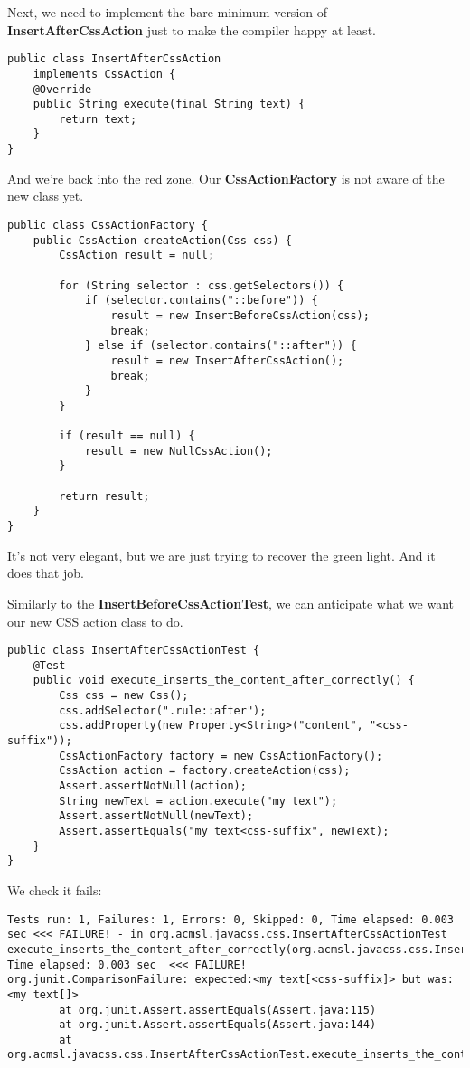 \documentclass[11pt]{article}
\begin{document}
Next, we need to implement the bare minimum version of \textbf{InsertAfterCssAction} just to make the
compiler happy at least.

\begin{verbatim}
public class InsertAfterCssAction
    implements CssAction {
    @Override
    public String execute(final String text) {
        return text;
    }
}
\end{verbatim}

And we're back into the red zone. Our \textbf{CssActionFactory} is not aware of the new class yet.

\begin{verbatim}
public class CssActionFactory {
    public CssAction createAction(Css css) {
        CssAction result = null;

        for (String selector : css.getSelectors()) {
            if (selector.contains("::before")) {
                result = new InsertBeforeCssAction(css);
                break;
            } else if (selector.contains("::after")) {
                result = new InsertAfterCssAction();
                break;
            }
        }

        if (result == null) {
            result = new NullCssAction();
        }

        return result;
    }
}
\end{verbatim}

It's not very elegant, but we are just trying to recover the green light. And it does
that job.

Similarly to the \textbf{InsertBeforeCssActionTest}, we can anticipate what we want our
new CSS action class to do.

\begin{verbatim}
public class InsertAfterCssActionTest {
    @Test
    public void execute_inserts_the_content_after_correctly() {
        Css css = new Css();
        css.addSelector(".rule::after");
        css.addProperty(new Property<String>("content", "<css-suffix"));
        CssActionFactory factory = new CssActionFactory();
        CssAction action = factory.createAction(css);
        Assert.assertNotNull(action);
        String newText = action.execute("my text");
        Assert.assertNotNull(newText);
        Assert.assertEquals("my text<css-suffix", newText);
    }
}
\end{verbatim}

We check it fails:

\begin{verbatim}
Tests run: 1, Failures: 1, Errors: 0, Skipped: 0, Time elapsed: 0.003 sec <<< FAILURE! - in org.acmsl.javacss.css.InsertAfterCssActionTest
execute_inserts_the_content_after_correctly(org.acmsl.javacss.css.InsertAfterCssActionTest)  Time elapsed: 0.003 sec  <<< FAILURE!
org.junit.ComparisonFailure: expected:<my text[<css-suffix]> but was:<my text[]>
        at org.junit.Assert.assertEquals(Assert.java:115)
        at org.junit.Assert.assertEquals(Assert.java:144)
        at org.acmsl.javacss.css.InsertAfterCssActionTest.execute_inserts_the_content_after_correctly(InsertAfterCssActionTest.java:69)
\end{verbatim}
\end{document}
